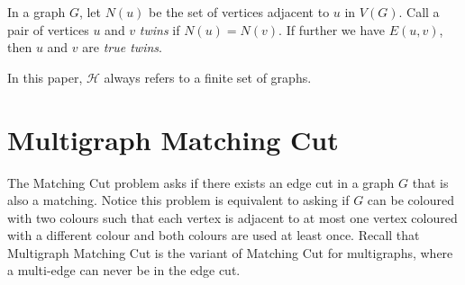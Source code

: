 \documentclass[a4paper,UKenglish,cleveref, autoref,thm-restate]{lipics-v2021}
\begin{document}
In a graph $G$, let $N(u)$ be the set of vertices adjacent to $u$ in $V(G)$. Call a pair of vertices $u$ and $v$ \emph{twins} if $N(u)=N(v)$. If further we have $E(u,v)$, then $u$ and $v$ are \emph{true twins}.

In this paper, $\mathcal{H}$ always refers to a finite set of graphs.



\section{Multigraph Matching Cut}\label{s-1}

The {\sc Matching Cut} problem asks if there exists an edge cut in 
a graph $G$ that is also a matching. Notice this problem is equivalent to asking if $G$ can be coloured with two colours such that each vertex is adjacent to at most one vertex coloured with a different colour and both colours are used at least once.
Recall that {\sc Multigraph Matching Cut} is the variant of {\sc Matching Cut} for multigraphs, where a multi-edge can never be in the edge cut.
\end{document}

